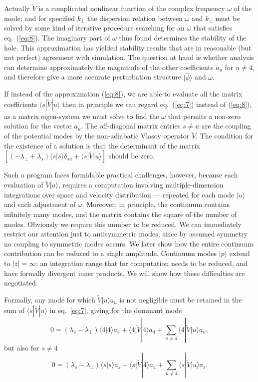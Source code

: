 \documentclass[12pt]{article}
\def\ket#1{|#1\rangle}
\def\bra#1{\langle#1}
\begin{document}
Actually $\tilde{V}$ is a complicated nonlinear function of the
complex frequency $\omega$ of the mode; and for specified $k_\perp$
the dispersion relation between $\omega$ and $k_\perp$ must be solved
by some kind of iterative procedure searching for an $\omega$ that
satisfies eq.\ (\ref{eq:8}). The imaginary part of $\omega$ thus found
determines the stability of the hole. This approximation has yielded
stability results\cite{Hutchinson2018a,Hutchinson2019,Hutchinson2019a} that are in reasonable (but not perfect) agreement
with simulation.  The question at hand is whether analysis can
determine approximately the magnitude of the other coefficients $a_u$
for $u\not=4$, and therefore give a more accurate perturbation
structure $\ket{\hat\phi}$ and $\omega$.

If instead of the approximation (\ref{eq:8}), we are able to evaluate all the
matrix coefficients $\bra{s}|\tilde{V}\ket{u}$ then in principle we can regard eq.\
(\ref{eq:7}) instead of (\ref{eq:8}), as a matrix eigen-system we must
solve to find the $\omega$ that permits a non-zero solution for the
vector $a_u$. The off-diagonal matrix entries $s\not=u$ are the
coupling of the potential modes by the non-adiabatic Vlasov operator
$\tilde{V}$.  The condition for the existence of a solution is that the
determinant of the matrix
$[(-\lambda_\perp+\lambda_s)\bra{s}\ket{s}\delta_{su}+\bra{s}|\tilde{V}\ket{u}]$ should
be zero.

Such a program faces formidable practical challenges, however, because
each evaluation of $\tilde{V}\ket{u}$, requires a computation
involving multiple-dimension integrations over space and velocity
distribution --- repeated for each mode $\ket{u}$ and each adjustment
of $\omega$.  Moreover, in principle, the continuum contains
infinitely many modes, and the matrix contains the square of the
number of modes.  Obviously we require this number to be reduced. We
can immediately restrict our attention just to antisymmetric modes, since by
assumed symmetry no coupling to symmetric modes occurs. We later show
how the entire continuum contribution can be reduced to a single
amplitude. Continuum modes $\ket{p}$ extend to
$|z|=\infty$: an integration range that for computation needs to be
reduced, and have formally divergent inner products. We will show how
these difficulties are negotiated.

Formally, any mode for which $\tilde{V}\ket{u}a_u$ is not negligible
must be retained in the sum of $\bra{s}|\tilde{V}\ket{u}$ in eq.\
\ref{eq:7}, giving for the dominant mode
\begin{equation}
  \label{eq:9}
  0=(\lambda_4-\lambda_\perp)\bra{4}\ket{4}a_4+\bra{4}|\tilde{V}\ket{4}a_4+\sum_{u\not=4}\bra{4}|\tilde{V}\ket{u}a_u,
\end{equation}
but also for $s\not=4$
\begin{equation}
  \label{eq:10}
 0=(\lambda_s-\lambda_\perp)\bra{s}\ket{s}a_s+\bra{s}|\tilde{V}\ket{4}a_4+\sum_{u\not=4}\bra{s}|\tilde{V}\ket{u}a_s.
\end{equation}
\end{document}
